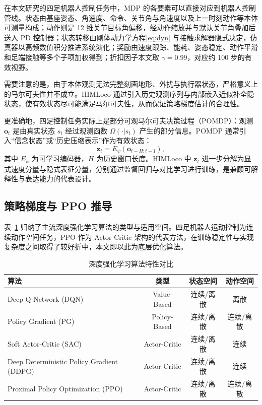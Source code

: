\documentclass[12pt,a4paper]{ctexart}
\numberwithin{equation}{section}
\numberwithin{table}{section}
\numberwithin{figure}{section}
\newcommand{\subtopic}[1]{\par\addvspace{0.2\baselineskip}\ignorespaces}
\begin{document}
\subtopic{MDP 在四足机器人控制中的实例化}
在本文研究的四足机器人控制任务中，MDP 的各要素可以直接对应到机器人控制管线。状态由基座姿态、角速度、命令、关节角与角速度以及上一时刻动作等本体可测量构成；动作则是 12 维关节目标角偏移，经动作缩放并与默认关节角叠加后送入 PD 控制器；状态转移由刚体动力学方程\eqref{eq:dyn} 与接触求解器隐式决定，仿真器以高频数值积分推进系统演化；奖励由速度跟踪、能耗、姿态稳定、动作平滑和足端接触等多个子项加权得到；折扣因子本文取 $\gamma=0.99$，对应约 100 步的有效视野。

需要注意的是，由于本体观测无法完整刻画地形、外扰与执行器状态，严格意义上的马尔可夫性并不成立。HIMLoco 通过引入历史观测序列与内部嵌入近似补全隐状态，使有效状态尽可能满足马尔可夫性，从而保证策略梯度估计的合理性。

\subtopic{部分可观马尔可夫决策过程}
更准确地，四足控制任务实际上是部分可观马尔可夫决策过程（POMDP）：观测 $\bm{o}_t$ 是由真实状态 $s_t$ 经过观测函数 $\Omega(\cdot|s_t)$ 产生的部分信息。POMDP 通常引入“信念状态”或“历史压缩表示”作为有效状态：
\begin{equation}
\bm{z}_t=E_\psi(\bm{o}_{t-H:t-1}),
\end{equation}
其中 $E_\psi$ 为可学习编码器，$H$ 为历史窗口长度。HIMLoco 中 $\bm{z}_t$ 进一步分解为显式速度分量与隐式表征分量，分别通过监督回归与对比学习进行训练，是兼顾可解释性与表达能力的代表设计。

\subsection{策略梯度与 PPO 推导}

表~\ref{tab:drl_comparison} 归纳了主流深度强化学习算法的类型与适用空间。四足机器人运动控制为连续动作空间任务，PPO 作为 Actor-Critic 架构的代表方法，在训练稳定性与实现复杂度之间取得了较好折中，本文即以此为底层优化算法。

\begin{table}[H]
\centering
\caption{深度强化学习算法特性对比}
\label{tab:drl_comparison}
\begin{tabular}{lccc}
\toprule
算法 & 类型 & 状态空间 & 动作空间 \\
\midrule
Deep Q-Network (DQN) & Value-Based & 连续/离散 & 离散 \\
Policy Gradient (PG) & Policy-Based & 连续/离散 & 连续/离散 \\
Soft Actor-Critic (SAC) & Actor-Critic & 连续/离散 & 连续 \\
Deep Deterministic Policy Gradient (DDPG) & Actor-Critic & 连续/离散 & 连续 \\
Proximal Policy Optimization (PPO) & Actor-Critic & 连续/离散 & 连续/离散 \\
\bottomrule
\end{tabular}
\end{table}
\end{document}
